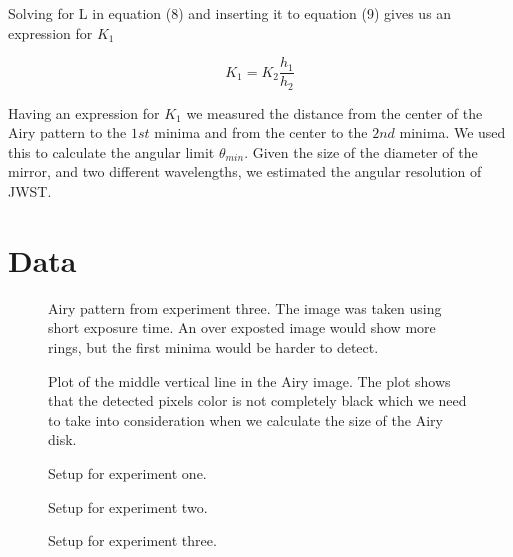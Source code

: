 \documentclass{emulateapj}
\begin{document}
Solving for L in equation (8) and inserting it to equation (9) gives us an expression for $K_1$

\begin{equation}
K_1 = K_2\frac{h_1}{h_2}
\end{equation}

Having an expression for $K_1$ we measured the distance from the center of the Airy pattern to the $1st$ minima and from the center to the $2nd$ minima. We used this to calculate the angular limit $\theta_{min}$. Given the size of the diameter of the mirror, and two different wavelengths, we estimated the angular resolution of JWST.

\section{Data}
\label{sec:data}

\begin{figure}[H]
\mbox{}
\caption{Airy pattern from experiment three. The image was taken using short exposure time. An over exposted image would show more rings, but the first minima would be harder to detect.}
\label{fig:figure_1_label}
\end{figure}

\begin{figure}[H]
\mbox{}
\caption{Plot of the middle vertical line in the Airy image. The plot shows that the detected pixels color is not completely black which we need to take into consideration when we calculate the size of the Airy disk.}
\label{fig:figure_2_label}
\end{figure}

\begin{figure}[H]
\mbox{}
\caption{Setup for experiment one.}
\label{fig:figure_3_label}
\end{figure}

\begin{figure}[H]
\mbox{}
\caption{Setup for experiment two.}
\label{fig:figure_4_label}
\end{figure}

\begin{figure}[H]
\mbox{}
\caption{Setup for experiment three.}
\label{fig:figure_5_label}
\end{figure}
\end{document}
